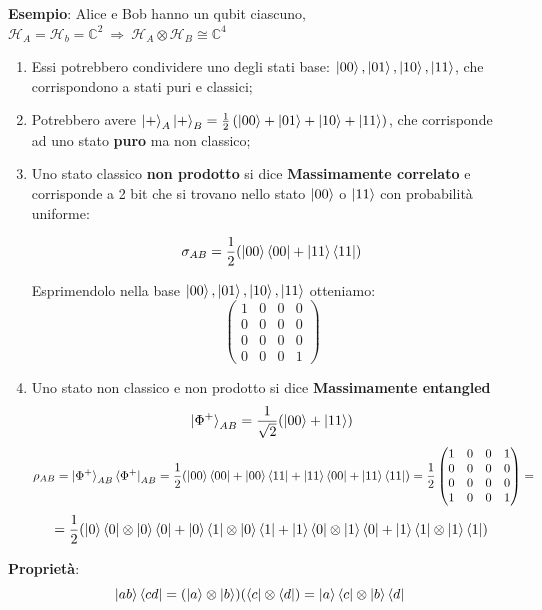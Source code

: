 \documentclass{report}
\begin{document}
\textbf{Esempio}: Alice e Bob hanno un qubit ciascuno,   $\mathcal{H}_A = \mathcal{H}_b = \mathbb{C}^2 \ \Rightarrow\  \mathcal{H}_A\otimes\mathcal{H}_B \cong
\mathbb{C}^4$
\begin{enumerate}
    \item Essi potrebbero condividere uno degli stati base: $\ket{00},\ket{01},\ket{10},\ket{11}$, che corrispondono a stati puri e classici;
    \item Potrebbero avere $\ket{+}_A\ket{+}_B= \frac{1}{2}\left( \ket{00}+\ket{01}+\ket{10}+\ket{11} \right)$, che corrisponde ad uno stato \textbf{puro} ma non classico;
    \item Uno stato classico \textbf{non prodotto} si dice \textbf{Massimamente correlato} e corrisponde a 2 bit che si trovano nello stato $\ket{00}$ o $\ket{11}$ con probabilità uniforme:
    
    $$
    	\sigma_{AB} = \frac{1}{2}(\ket{00}\bra{00} + \ket{11}\bra{11})
    $$
    
    Esprimendolo nella base ${\ket{00},\ket{01},\ket{10},\ket{11}}$ otteniamo:
    $$
        \begin{pmatrix}
            1 &0 &0 &0\\
            0 &0 &0 &0\\
            0 &0 &0 &0\\
            0 &0 &0 &1
        \end{pmatrix}
    $$
    \item  Uno stato non classico e non prodotto si dice \textbf{Massimamente entangled} 
    $$\ket{\Phi^+}_{AB}=\frac{1}{\sqrt{2}}(\ket{00}+\ket{11})$$
    $$\rho_{AB}=\ket{\Phi^+}_{AB}\bra{\Phi^+}_{AB}
    =\frac{1}{2}(\ket{00}\bra{00}+\ket{00}\bra{11}+\ket{11}\bra{00}+\ket{11}\bra{11})= \frac{1}{2}
        \begin{pmatrix}
            1 & 0 & 0 & 1 \\
            0 & 0 & 0 & 0 \\
            0 & 0 & 0 & 0 \\
            1 & 0 & 0 & 1
        \end{pmatrix}
        =
    $$
    $$=\frac{1}{2}(\ket{0}\bra{0}\otimes\ket{0}\bra{0}+\ket{0}\bra{1}\otimes\ket{0}\bra{1}+\ket{1}\bra{0}\otimes\ket{1}\bra{0}+\ket{1}\bra{1}\otimes\ket{1}\bra{1})$$
\end{enumerate}

\textbf{Proprietà}:
$$
\ket{ab}\bra{cd} = (\ket{a}\otimes\ket{b})(\bra{c}\otimes\bra{d}) = \ket{a}\bra{c}\otimes\ket{b}\bra{d}
$$
\end{document}
